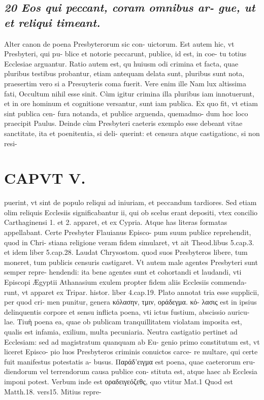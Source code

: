 \documentclass{article}
\begin{document}
\begin{pages}
\subsection*{\textit{20 Eos qui peccant, coram omnibus ar- gue, ut et reliqui timeant. }}\pstart Alter canon de poena Presbyterorum sic con- uictorum. Est autem hic, vt Presbyteri, qui pu- blice et notorie peccarunt, publice, id est, in coe- tu totius Ecclesiae arguantur.  \pend\pstart Ratio autem est, qu huiusm odi crimina et facta, quae pluribus testibus probantur, etiam antequam delata sunt, pluribus sunt nota, praesertim vero si a Presuyteris coma fuerit. Vere enim ille Nam lux altissima fati, Occultum nihil esse sinit. Cùm igitur crimina illa pluribus iam innotuerunt, et in ore hominum et cognitione versantur, sunt iam publica. Ex quo fit, vt etiam sint publica cen- fura notanda, et publice arguenda, quemadmo- dum hoc loco praecipit Paulus.  \pend\pstart Deinde cùm Presbyteri caeteris exemplo esse debeant vitae sanctitate, ita et poenitentia, si deli- querint: et censura atque castigationc, si non resi-  \pend
\section*{CAPVT  V. }
\marginpar{[ p.317 ]}\pstart puerint, vt sint de populo reliqui ad iniuriam, et peccandum tardiores. Sed etiam olim reliquis Ecclesiis significabantur ii, qui ob scelus erant depositi, vtex concilio Carthaginensi 1. et 2. apparet, et ex Cypria. Atque has literas formatas appellabant. Certe Presbyter Flauianus Episco- pum suum publice reprehendit, quod in Chri- stiana religione veram fidem simularet, vt ait Theod.libus 5.cap.3. et idem liber  5.cap.28. Laudat Chrysostom. quod suos Presbyteros libere, tum moneret, tum publicis censuris castigaret. Vt autem male agentes Presbyteri sunt semper repre- hendendi: ita bene agentes sunt et cohortandi et laudandi, vti Episcopi Ægyptii Athanasium exulem propter fidem aliis Ecclesiis commenda- runt, vt apparet ex Tripar. histor. liber  4.cap.19.  \pend\pstart Plato annotat tria esse supplicii, per quod cri- men punitur, genera κόλασην, τμιν, οράδεγμα. κό- λασις est in ipsius delinquentis corpore et sensu inflicta poena, vti ictus fustium, abscissio auricu- lae. Tiuὴ poena ea, quae ob publicam tranquillitatem violatam imposita est, qualis est infamia, exilium, multa pecuniaria. Neutra castigatio pertinet ad Ecclesiam: sed ad magistratum quanquam ab Eu- genio primo constitutum est, vt liceret Episco- pio luos Presbyteros criminis conuictos carce- re multare, qui certe fuit manifestus potestatis a- busus. Παράδ'ειγμα est poena, quae caeterorum eru- diendorum vel terrendorum causa publice con- stituta est, atque haec ab Ecclesia imponi potest. Verbum inde est οραδειγεόζεθς, quo vtitur Mat.1  \pend{} Quod est Matth.18. vers15. Mitius repre-  \pend

\end{pages}
\end{document}
